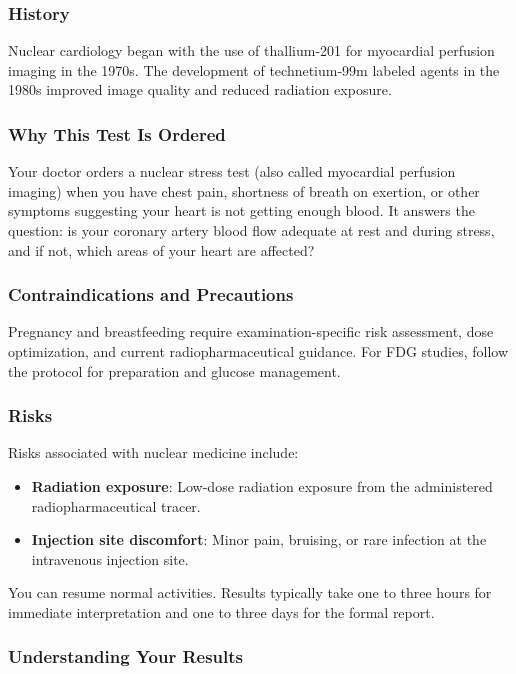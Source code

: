 \subsubsection*{History}
Nuclear cardiology began with the use of thallium-201 for myocardial perfusion imaging in the 1970s. The development of technetium-99m labeled agents in the 1980s improved image quality and reduced radiation exposure.

\subsubsection*{Why This Test Is Ordered}
Your doctor orders a nuclear stress test (also called myocardial perfusion imaging) when you have chest pain, shortness of breath on exertion, or other symptoms suggesting your heart is not getting enough blood. It answers the question: is your coronary artery blood flow adequate at rest and during stress, and if not, which areas of your heart are affected?

\subsubsection*{Contraindications and Precautions}
Pregnancy and breastfeeding require examination-specific risk assessment, dose optimization, and current radiopharmaceutical guidance. For FDG studies, follow the protocol for preparation and glucose management.

\subsubsection*{Risks}
Risks associated with nuclear medicine include:
\begin{itemize}
    \item \textbf{Radiation exposure}: Low-dose radiation exposure from the administered radiopharmaceutical tracer.
    \item \textbf{Injection site discomfort}: Minor pain, bruising, or rare infection at the intravenous injection site.
\end{itemize}


You can resume normal activities. Results typically take one to three hours for immediate interpretation and one to three days for the formal report.

\subsubsection*{Understanding Your Results}

